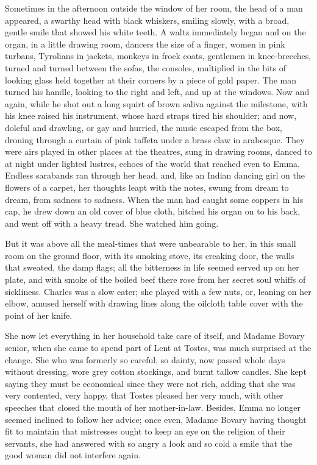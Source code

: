 \documentclass{tufte-book}
\begin{document}
Sometimes in the afternoon outside the window of her room, the head of a
man appeared, a swarthy head with black whiskers, smiling slowly, with
a broad, gentle smile that showed his white teeth. A waltz immediately
began and on the organ, in a little drawing room, dancers the size of
a finger, women in pink turbans, Tyrolians in jackets, monkeys in frock
coats, gentlemen in knee-breeches, turned and turned between the sofas,
the consoles, multiplied in the bits of looking glass held together
at their corners by a piece of gold paper. The man turned his handle,
looking to the right and left, and up at the windows. Now and again,
while he shot out a long squirt of brown saliva against the milestone,
with his knee raised his instrument, whose hard straps tired his
shoulder; and now, doleful and drawling, or gay and hurried, the music
escaped from the box, droning through a curtain of pink taffeta under
a brass claw in arabesque. They were airs played in other places at
the theatres, sung in drawing rooms, danced to at night under lighted
lustres, echoes of the world that reached even to Emma. Endless
sarabands ran through her head, and, like an Indian dancing girl on the
flowers of a carpet, her thoughts leapt with the notes, swung from dream
to dream, from sadness to sadness. When the man had caught some coppers
in his cap, he drew down an old cover of blue cloth, hitched his organ
on to his back, and went off with a heavy tread. She watched him going.

But it was above all the meal-times that were unbearable to her, in this
small room on the ground floor, with its smoking stove, its creaking
door, the walls that sweated, the damp flags; all the bitterness in life
seemed served up on her plate, and with smoke of the boiled beef there
rose from her secret soul whiffs of sickliness. Charles was a slow
eater; she played with a few nuts, or, leaning on her elbow, amused
herself with drawing lines along the oilcloth table cover with the point
of her knife.

She now let everything in her household take care of itself, and Madame
Bovary senior, when she came to spend part of Lent at Tostes, was much
surprised at the change. She who was formerly so careful, so dainty,
now passed whole days without dressing, wore grey cotton stockings, and
burnt tallow candles. She kept saying they must be economical since
they were not rich, adding that she was very contented, very happy, that
Tostes pleased her very much, with other speeches that closed the mouth
of her mother-in-law. Besides, Emma no longer seemed inclined to follow
her advice; once even, Madame Bovary having thought fit to maintain that
mistresses ought to keep an eye on the religion of their servants, she
had answered with so angry a look and so cold a smile that the good
woman did not interfere again.
\end{document}
